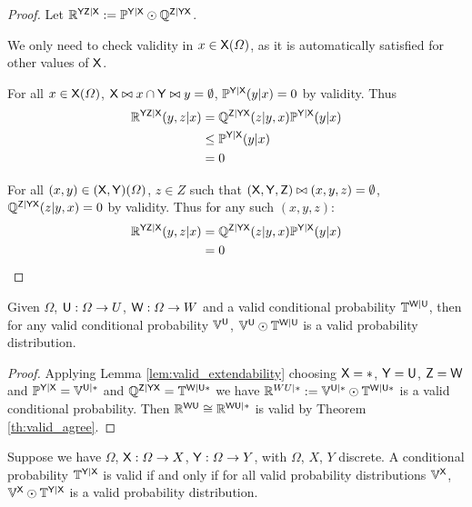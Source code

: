 \begin{proof}
Let $\mathbb{R}^{\mathsf{YZ}|\mathsf{X}}:=\mathbb{P}^{\mathsf{Y}|\mathsf{X}}\odot \mathbb{Q}^{\mathsf{Z}|\mathsf{Y}\mathsf{X}}$.

We only need to check validity in $x\in \mathsf{X}(\Omega)$, as it is automatically satisfied for other values of $\mathsf{X}$.

For all $x\in \mathsf{X}(\Omega)$, $\mathsf{X}\bowtie x\cap\mathsf{Y}\bowtie y=\emptyset$, $\mathbb{P}^{\mathsf{Y}|\mathsf{X}}(y|x)=0$ by validity. Thus
\begin{align}
	\mathbb{R}^{\mathsf{YZ}|\mathsf{X}}(y,z|x) &= \mathbb{Q}^{\mathsf{Z}|\mathsf{YX}}(z|y,x)\mathbb{P}^{\mathsf{Y}|\mathsf{X}}(y|x)\\
								  &\leq \mathbb{P}^{\mathsf{Y}|\mathsf{X}}(y|x)\\
								  &=0
\end{align}

For all $(x,y)\in (\mathsf{X},\mathsf{Y})(\Omega)$, $z\in Z$ such that $(\mathsf{X},\mathsf{Y},\mathsf{Z})\bowtie (x,y,z)=\emptyset$, $\mathbb{Q}^{\mathsf{Z}|\mathsf{YX}}(z|y,x)=0$ by validity. Thus for any such $(x,y,z)$:
\begin{align}
	\mathbb{R}^{\mathsf{YZ}|\mathsf{X}}(y,z|x) &= \mathbb{Q}^{\mathsf{Z}|\mathsf{YX}}(z|y,x)\mathbb{P}^{\mathsf{Y}|\mathsf{X}}(y|x)\\
								  &=0
\end{align}
\end{proof}

\begin{corollary}\label{corr:valid_extend_order1}
Given $\Omega$, $\mathsf{U}:\Omega\to U$, $\mathsf{W}:\Omega\to W$ and a valid conditional probability $\mathbb{T}^{\mathsf{W}|\mathsf{U}}$, then for any valid conditional probability $\mathbb{V}^{\mathsf{U}}$, $\mathbb{V}^{\mathsf{U}}\odot \mathbb{T}^{\mathsf{W}|\mathsf{U}}$ is a valid probability distribution.
\end{corollary}

\begin{proof}
Applying Lemma \ref{lem:valid_extendability} choosing $\mathsf{X}=*$, $\mathsf{Y}=\mathsf{U}$, $\mathsf{Z}=\mathsf{W}$ and $\mathbb{P}^{\mathsf{Y}|\mathsf{X}}=\mathbb{V}^{\mathsf{U}|*}$ and $\mathbb{Q}^{\mathsf{Z}|\mathsf{YX}}=\mathbb{T}^{\mathsf{W}|\mathsf{U*}}$ we have $\mathbb{R}^{WU|*}:=\mathbb{V}^{\mathsf{U}|*}\odot \mathbb{T}^{\mathsf{W}|\mathsf{U}*}$ is a valid conditional probability. Then $\mathbb{R}^{\mathsf{WU}}\cong \mathbb{R}^{\mathsf{WU}|*}$ is valid by Theorem \ref{th:valid_agree}.
\end{proof}

\begin{theorem}\label{th:valid_conditional_probability}
Suppose we have $\Omega$, $\mathsf{X}:\Omega\to X$, $\mathsf{Y}:\Omega\to Y$, with $\Omega$, $X$, $Y$ discrete. A conditional probability $\mathbb{T}^{\mathsf{Y}|\mathsf{X}}$ is valid if and only if for all valid probability distributions $\mathbb{V}^{\mathsf{X}}$, $\mathbb{V}^{\mathsf{X}}\odot \mathbb{T}^{\mathsf{Y}|\mathsf{X}}$ is a valid probability distribution.
\end{theorem}

